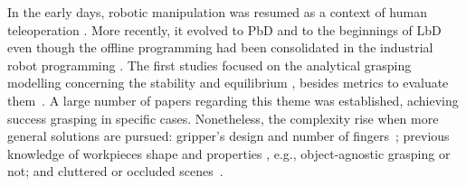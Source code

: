 In the early days, robotic manipulation was resumed as a context of human teleoperation \cite{bejczy1980sensors}. More recently, it evolved to \ac{PbD} \cite{ferreira2016stereo} and to the beginnings of \ac{LbD} \cite{suleman2011learning} even though the offline programming had been consolidated in the industrial robot programming \cite{de2020adaptpack,castro2020adaptpack}. The first studies focused on the analytical grasping modelling concerning the stability and equilibrium \cite{diziouglu1984mechanics, Nguyen1987_1, Nguyen1987_2, Ponce1995, Li2003}, besides metrics to evaluate them~\cite{Ferrari, Bicchi2000, Roa2014}. A large number of papers regarding this theme was established, achieving success grasping in specific cases. Nonetheless, the complexity rise when more general solutions are pursued: gripper's design and number of fingers~\cite{chen2020active}; previous knowledge of workpieces shape and properties \cite{babin2019stable,babin2019stable,bjornsson2018automated}, e.g., object-agnostic grasping or not; and cluttered or occluded scenes~\cite{d2020study}.

\begin{figure}[h]
\end{figure}


